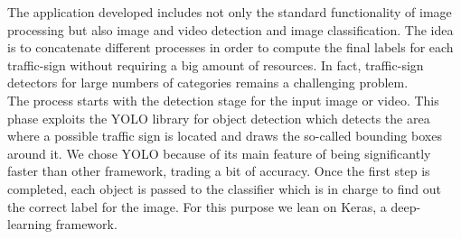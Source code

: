 The application developed includes not only the standard functionality of image processing but also image and video detection and image classification. The idea is to concatenate different processes in order to compute the final labels for each traffic-sign without requiring a big amount of resources. In fact, traffic-sign detectors for large numbers of categories remains a challenging problem.\\ The process starts with the detection stage for the input image or video. This phase exploits the YOLO \cite{yolo} library for object detection which detects the area where a possible traffic sign is located and draws the so-called bounding boxes around it. We chose YOLO because of its main feature of being significantly faster than other framework, trading a bit of accuracy. Once the first step is completed, each object is passed to the classifier which is in charge to find out the correct label for the image. For this purpose we lean on Keras, a deep-learning framework.
